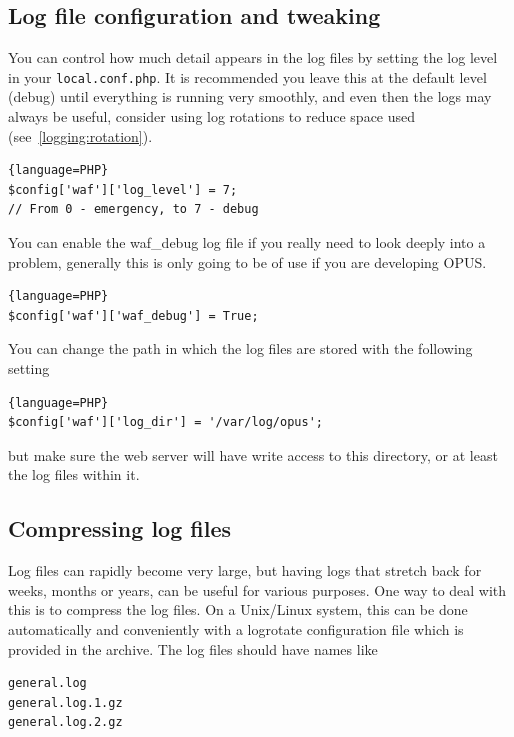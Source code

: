 \documentclass[12 pt]{book}
\begin{document}
\subsection{Log file configuration and tweaking}

You can control how much detail appears in the log files by setting the log level in your \lstinline!local.conf.php!.
It is recommended you leave this at the default level (debug) until everything is running very smoothly, and even then
the logs may always be useful, consider using log rotations to reduce space used (see~\ref{logging:rotation}).

\begin{lstlisting}{language=PHP}
$config['waf']['log_level'] = 7;
// From 0 - emergency, to 7 - debug
\end{lstlisting}

You can enable the waf\_debug log file if you really need to look deeply into a problem, generally this is only going
to be of use if you are developing OPUS.

\begin{lstlisting}{language=PHP}
$config['waf']['waf_debug'] = True;
\end{lstlisting}

You can change the path in which the log files are stored with the following setting

\begin{lstlisting}{language=PHP}
$config['waf']['log_dir'] = '/var/log/opus';
\end{lstlisting}

but make sure the web server will have write access to this directory, or at least the log files within it.


\subsection{Compressing log files}

Log files can rapidly become very large, but having logs that stretch back for weeks, months or years, can
be useful for various purposes. One way to deal with this is to compress the log files. On a Unix/Linux
system, this can be done automatically and conveniently with a logrotate configuration file which is
provided in the archive. The log files should have names like

\begin{lstlisting}
general.log
general.log.1.gz
general.log.2.gz
\end{lstlisting}
\end{document}

